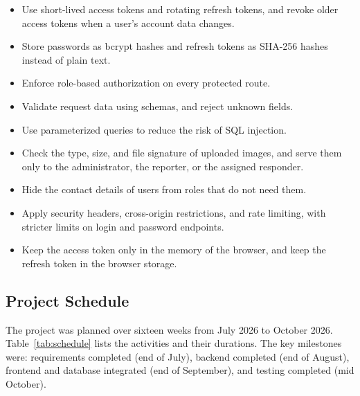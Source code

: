 \documentclass[a4paper,12pt]{report}
\begin{document}
	\begin{itemize}
		\item Use short-lived access tokens and rotating refresh tokens, and revoke older access tokens when a user's account data changes.
		\item Store passwords as bcrypt hashes and refresh tokens as SHA-256 hashes instead of plain text.
		\item Enforce role-based authorization on every protected route.
		\item Validate request data using schemas, and reject unknown fields.
		\item Use parameterized queries to reduce the risk of SQL injection.
		\item Check the type, size, and file signature of uploaded images, and serve them only to the administrator, the reporter, or the assigned responder.
		\item Hide the contact details of users from roles that do not need them.
		\item Apply security headers, cross-origin restrictions, and rate limiting, with stricter limits on login and password endpoints.
		\item Keep the access token only in the memory of the browser, and keep the refresh token in the browser storage.
	\end{itemize}
	
	\subsection{Project Schedule}
	
	The project was planned over sixteen weeks from July 2026 to October 2026. Table~\ref{tab:schedule} lists the activities and their durations. The key milestones were: requirements completed (end of July), backend completed (end of August), frontend and database integrated (end of September), and testing completed (mid October).
	
\end{document}
